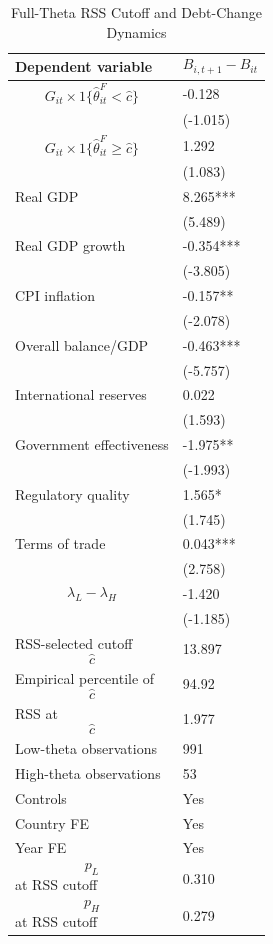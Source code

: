 \begin{table}[H]\centering
\begin{threeparttable}
\caption{Full-Theta RSS Cutoff and Debt-Change Dynamics}
\label{tab:deltaB_rss_cutoff_fulltheta}
\scriptsize
\begin{tabularx}{\textwidth}{lY}
\toprule
Dependent variable & $$B_{i,t+1}-B_{it}$$ \\
\midrule
$$G_{it}\times 1\{\widehat{\theta}^{F}_{it}<\widehat{c}\}$$ & -0.128 \\
 & (-1.015) \\
$$G_{it}\times 1\{\widehat{\theta}^{F}_{it}\geq\widehat{c}\}$$ & 1.292 \\
 & (1.083) \\
Real GDP & 8.265*** \\
 & (5.489) \\
Real GDP growth & -0.354*** \\
 & (-3.805) \\
CPI inflation & -0.157** \\
 & (-2.078) \\
Overall balance/GDP & -0.463*** \\
 & (-5.757) \\
International reserves & 0.022 \\
 & (1.593) \\
Government effectiveness & -1.975** \\
 & (-1.993) \\
Regulatory quality & 1.565* \\
 & (1.745) \\
Terms of trade & 0.043*** \\
 & (2.758) \\
$$\lambda_L-\lambda_H$$ & -1.420 \\
 & (-1.185) \\
\midrule
RSS-selected cutoff $$\widehat{c}$$ & 13.897 \\
Empirical percentile of $$\widehat{c}$$ & 94.92 \\
RSS at $$\widehat{c}$$ & 1.977 \\
Low-theta observations & 991 \\
High-theta observations & 53 \\
Controls & Yes \\
Country FE & Yes \\
Year FE & Yes \\
$$p_L$$ at RSS cutoff & 0.310 \\
$$p_H$$ at RSS cutoff & 0.279 \\

\end{tabularx}
\end{threeparttable}
\end{table}
